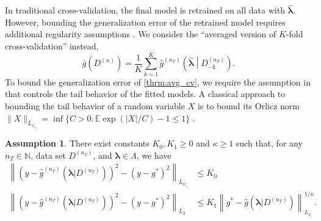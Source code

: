 \documentclass[12pt]{article} %
\theoremstyle{definition}
\newtheorem{assump}{Assumption}
\begin{document}
In traditional cross-validation, the final model is retrained on all data with $\hat{\boldsymbol{\lambda}}$.
However, bounding the generalization error of the retrained model requires additional regularity assumptions \citep{lecue2012oracle}. We consider the ``averaged version of $K$-fold cross-validation'' instead,
\begin{equation}
\label{thrm:avg_cv}
\bar{g}\left ( {D^{(n)}} \right ) =
\frac{1}{K} \sum_{k=1}^K
\hat{g}^{(n_T)} \left (\hat{\boldsymbol \lambda} \middle | D^{(n_T)}_{-k} \right ).
\end{equation}
To bound the generalization error of \eqref{thrm:avg_cv}, we require the assumption in \citet{lecue2012oracle} that controls the tail behavior of the fitted models.
A classical approach to bounding the tail behavior of a random variable $X$ is to bound its Orlicz norm
$\|X\|_{L_{\psi_1}}= \inf \{C > 0: \mathbb{E}\exp(|X|/C) - 1 \le 1\}$ \citep[Chap. 2]{van1996weak}.
\begin{assump}
	\label{assump:tail_margin}
	There exist constants $K_0, K_1 \ge 0$ and $\kappa \ge 1$ such that, for any $n_T \in \mathbb{N}$, data set $D^{(n_T)}$, and $\boldsymbol{\lambda} \in \Lambda$, we have
	\begin{align}
	\left \|
	\left(
	y - \hat{g}^{(n_T)}(\boldsymbol{\lambda} | D^{(n_T)})
	\right)^2
	- \left(
	y - g^*
	\right)^2
	\right \|_{L_{\psi_1}} & \le K_0
	\label{eq:cv_assump1}\\
	\left \|
	\left(
	y - \hat{g}^{(n_T)}(\boldsymbol{\lambda} | D^{(n_T)})
	\right)^2
	- \left(
	y - g^*
	\right)^2
	\right \|_{L_2}
	& \le
	K_1 \left \|
	g^{*}-\hat{g}(\boldsymbol{\lambda}|D^{(n_{T})})
	\right \|_{L_{2}}^{1/\kappa}.
	\label{eq:cv_assump2}
	\end{align}
\end{assump}
\end{document}
